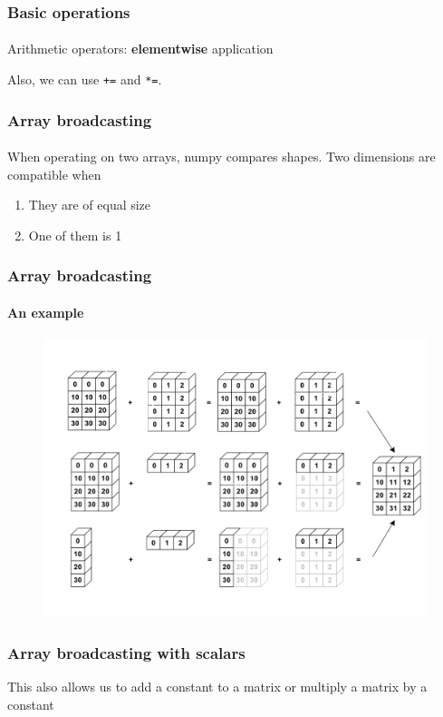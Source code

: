 \begin{frame}[fragile]\frametitle{Basic operations}
    \framesubtitle{}

    Arithmetic operators: \textbf{elementwise} application


    Also, we can use \verb|+=| and \verb|*=|.

\end{frame}

\begin{frame}\frametitle{Array broadcasting}
    \framesubtitle{}

    When operating on two arrays, numpy compares shapes.
    Two dimensions are compatible when
    \begin{enumerate}
        \item They are of equal size
        \item One of them is 1
    \end{enumerate}

\end{frame}

\begin{frame}\frametitle{Array broadcasting}
    \framesubtitle{An example}

    \begin{figure}
        \centering
        \includegraphics[scale=0.3]{img/broadcasting.png}
    \end{figure}

\end{frame}

\begin{frame}\frametitle{Array broadcasting with scalars}


    This also allows us to add a constant to a matrix or multiply a matrix by a constant




\end{frame}

